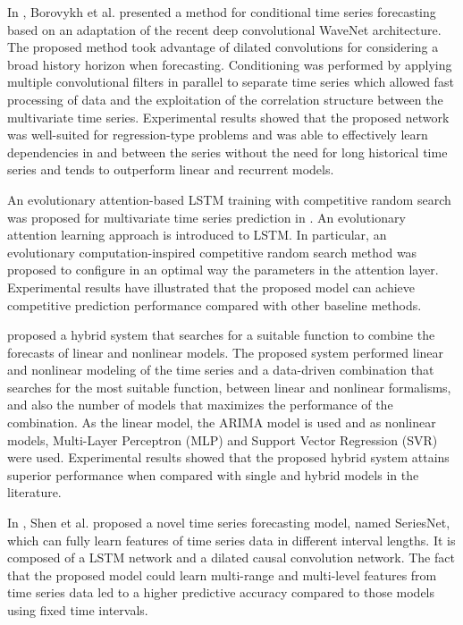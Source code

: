 In \cite{Borovykh2017}, Borovykh et al. presented a method for conditional time series forecasting based on an adaptation of the recent deep convolutional WaveNet architecture.
The proposed method took advantage of dilated convolutions for considering a broad history horizon when forecasting.
Conditioning was performed by applying multiple convolutional filters in parallel to separate time series which allowed fast processing of data and the exploitation of the correlation structure between the multivariate time series.
Experimental results showed that the proposed network was well-suited for regression-type problems and was able to effectively learn dependencies in and between the series without the need for long historical time series and tends to outperform linear and recurrent models.

An evolutionary attention-based LSTM training with competitive random search was proposed for multivariate time series prediction in \cite{LI2019104785}.
An evolutionary attention learning approach is introduced to LSTM.
In particular, an evolutionary computation-inspired competitive random search method was proposed to configure in an optimal way the parameters in the attention layer.
Experimental results have illustrated that the proposed model can achieve competitive prediction performance compared with other baseline methods.

\cite{DEOSANTOSJUNIOR201972} proposed a hybrid system that searches for a suitable function to combine the forecasts of linear and nonlinear models.
The proposed system performed linear and nonlinear modeling of the time series and a data-driven combination that searches for the most suitable function, between linear and nonlinear formalisms, and also the number of models that maximizes the performance of the combination.
As the linear model, the ARIMA model is used and as nonlinear models, Multi-Layer Perceptron (MLP) and Support Vector Regression (SVR) were used.
Experimental results showed that the proposed hybrid system attains superior performance when compared with single and hybrid models in the literature.

In \cite{SHEN2020302}, Shen et al. proposed a novel time series forecasting model, named SeriesNet, which can fully learn features of time series data in different interval lengths.
It is composed of a LSTM network and a dilated causal convolution network.
The fact that the proposed model could learn multi-range and multi-level features from time series data led to a higher predictive accuracy compared to those models using fixed time intervals.


